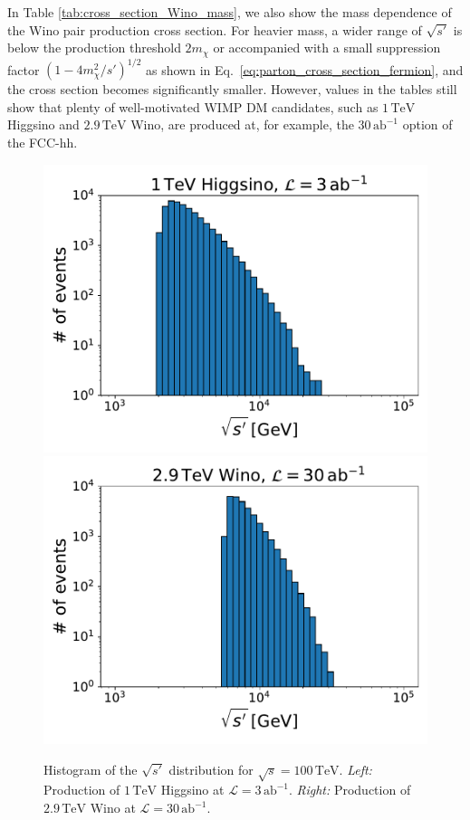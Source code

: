 \documentclass[12pt,twoside,book]{article}
\begin{document}
In Table \ref{tab:cross_section_Wino_mass}, we also show the mass dependence of the Wino pair production cross section.
For heavier mass, a wider range of $\sqrt{s'}$ is below the production threshold $2 m_{\chi}$ or accompanied with a small suppression factor $\left( 1-4 m_\chi^2 / s' \right)^{1/2}$ as shown in Eq.~\eqref{eq:parton_cross_section_fermion}, and the cross section becomes significantly smaller.
However, values in the tables still show that plenty of well-motivated WIMP DM candidates, such as $1\,\mathrm{TeV}$ Higgsino and $2.9\,\mathrm{TeV}$ Wino, are produced at, for example, the $30\,\mathrm{ab}^{-1}$ option of the FCC-hh.

\begin{figure}[t]
  \centering
  \includegraphics[width=0.48\hsize]{invariant_mass_Higgsino.pdf}
  \includegraphics[width=0.48\hsize]{invariant_mass_Wino.pdf}
  \caption{
    Histogram of the $\sqrt{s'}$ distribution for $\sqrt{s} = 100\,\mathrm{TeV}$.
    \textit{Left:} Production of $1\,\mathrm{TeV}$ Higgsino at $\mathcal{L} = 3\,\mathrm{ab}^{-1}$.
    \textit{Right:} Production of $2.9\,\mathrm{TeV}$ Wino at $\mathcal{L} = 30\,\mathrm{ab}^{-1}$.}
  \label{fig:invariant_mass}
\end{figure}
\end{document}
